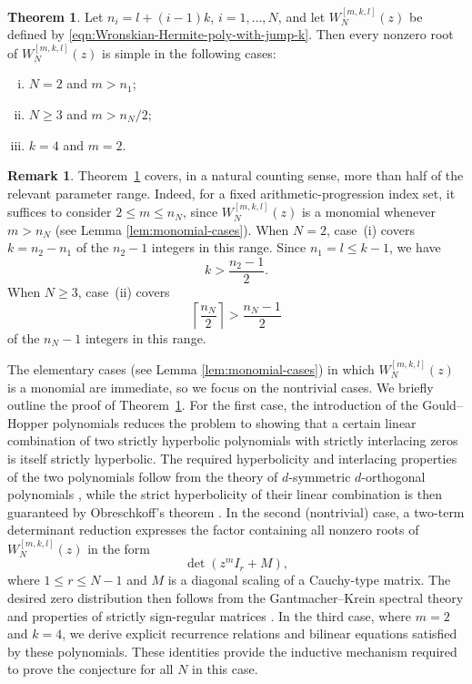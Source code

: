 \documentclass[preprint,3p,10pt]{elsarticle}
\theoremstyle{definition}
\newtheorem{remark}{Remark}[section]
\newtheorem{theorem}{Theorem}[section]
\begin{document}
\begin{theorem}\label{thm:main-intro}
Let \(n_i=l+(i-1)k\), \(i=1,\ldots,N\), and let
\(W_N^{[m,k,l]}(z)\) be defined by \eqref{eqn:Wronskian-Hermite-poly-with-jump-k}.
Then every nonzero root of \(W_N^{[m,k,l]}(z)\) is simple in the following cases:
\begin{enumerate}[(i)]
    \item \(N=2\) and \(m>n_1\);
    \item \(N\ge3\) and \(m>n_N/2\);
    \item \(k=4\) and \(m=2\).
\end{enumerate}
\end{theorem}

\begin{remark}\label{rem:more-than-half}
Theorem~\ref{thm:main-intro} covers, in a natural counting sense, more than
half of the relevant parameter range. Indeed, for a fixed
arithmetic-progression index set, it suffices to consider
\(2\le m\le n_N\), since \(W_N^{[m,k,l]}(z)\) is a monomial whenever \(m>n_N\) (see Lemma \ref{lem:monomial-cases}). When \(N=2\), case~(i) covers \(k=n_2-n_1\) of the \(n_2-1\)
integers in this range. Since \(n_1=l\le k-1\), we have
\[
    k>\frac{n_2-1}{2}.
\]
When \(N\ge3\), case~(ii) covers
\[
    \left\lceil\frac{n_N}{2}\right\rceil >
    \frac{n_N-1}{2}
\]
of the \(n_N-1\) integers in this range.
\end{remark}

The elementary cases (see Lemma \ref{lem:monomial-cases}) in which \(W_N^{[m,k,l]}(z)\) is a monomial are immediate, so we focus on the nontrivial cases. 
We briefly outline the proof of Theorem~\ref{thm:main-intro}. For the first case,  the introduction of the Gould--Hopper polynomials reduces the problem
to showing that a certain linear combination of two strictly hyperbolic
polynomials with strictly interlacing zeros is itself strictly hyperbolic.
The required hyperbolicity and interlacing properties of the two polynomials follow from the theory of \(d\)-symmetric \(d\)-orthogonal
polynomials \cite{romdhane2008zeros}, while the strict hyperbolicity of their
linear combination is then guaranteed by Obreschkoff's theorem
\cite{obreschkoff1963verteilung,borcea2009polya}.
In the second (nontrivial) case, a two-term determinant reduction expresses
the factor containing all nonzero roots of
\(W_N^{[m,k,l]}(z)\) in the form
\[
\det(z^m I_r+M),
\]
where $1 \leq r \leq N-1$ and \(M\) is a diagonal scaling of a Cauchy-type matrix. The desired zero distribution then follows from the
Gantmacher--Krein spectral theory and properties of strictly sign-regular
matrices
\cite{GantmacherKrein2002,AlseidiMargaliotGarloff2019}.
In the third case,
where \(m=2\) and \(k=4\), we derive explicit recurrence relations and
bilinear equations satisfied by these polynomials. These identities provide
the inductive mechanism required to prove the conjecture for all \(N\) in this
case.
\end{document}
